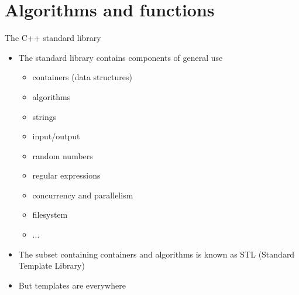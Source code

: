 
\section{Algorithms and functions}

\begin{frame}{The C++ standard library}

  \begin{itemize}[<+->]
  \item The standard library contains components of general use
    \begin{itemize}[<.->]
    \item \alert<2>{containers (data structures)}
    \item \alert<2>{algorithms}
    \item strings
    \item input/output
    \item random numbers
    \item regular expressions
    \item concurrency and parallelism
    \item filesystem
    \item ...
    \end{itemize}

  \item The subset containing containers and algorithms is
    known as STL (Standard Template Library)
  \item But templates are everywhere
  \end{itemize}

\end{frame}

